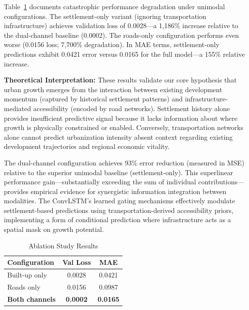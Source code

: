 \documentclass[conference]{IEEEtran}
\begin{document}
Table~\ref{tab:ablation} documents catastrophic performance degradation under unimodal configurations. The settlement-only variant (ignoring transportation infrastructure) achieves validation loss of 0.0028---a 1,186\% increase relative to the dual-channel baseline (0.0002). The roads-only configuration performs even worse (0.0156 loss; 7,700\% degradation). In MAE terms, settlement-only predictions exhibit 0.0421 error versus 0.0165 for the full model---a 155\% relative increase.

\textbf{Theoretical Interpretation:} These results validate our core hypothesis that urban growth emerges from the interaction between existing development momentum (captured by historical settlement patterns) and infrastructure-mediated accessibility (encoded by road networks). Settlement history alone provides insufficient predictive signal because it lacks information about where growth is physically constrained or enabled. Conversely, transportation networks alone cannot predict urbanization intensity absent context regarding existing development trajectories and regional economic vitality.

The dual-channel configuration achieves 93\% error reduction (measured in MSE) relative to the superior unimodal baseline (settlement-only). This superlinear performance gain---substantially exceeding the sum of individual contributions---provides empirical evidence for synergistic information integration between modalities. The ConvLSTM's learned gating mechanisms effectively modulate settlement-based predictions using transportation-derived accessibility priors, implementing a form of conditional prediction where infrastructure acts as a spatial mask on growth potential.

\begin{table}[htbp]
\caption{Ablation Study Results}
\begin{center}
\begin{tabular}{lcc}
\toprule
\textbf{Configuration} & \textbf{Val Loss} & \textbf{MAE} \\
\midrule
Built-up only & 0.0028 & 0.0421 \\
Roads only & 0.0156 & 0.0987 \\
\textbf{Both channels} & \textbf{0.0002} & \textbf{0.0165} \\
\bottomrule
\end{tabular}
\label{tab:ablation}
\end{center}
\end{table}
\end{document}
